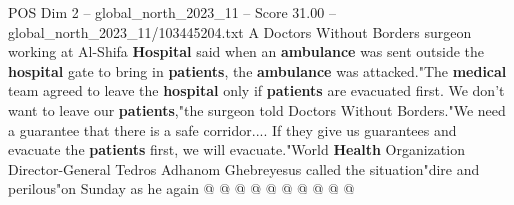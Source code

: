 \begin{textsample}{POS Dim 2 – global\_north\_2023\_11 – Score 31.00 – global\_north\_2023\_11/103445204.txt}
A Doctors Without Borders surgeon working at Al-Shifa \textbf{Hospital} said when an \textbf{ambulance} was sent outside the \textbf{hospital} gate to bring in \textbf{patients}, the \textbf{ambulance} was attacked."The \textbf{medical} team agreed to leave the \textbf{hospital} only if \textbf{patients} are evacuated first.
We don't want to leave our \textbf{patients},"the surgeon told Doctors Without Borders."We need a guarantee that there is a safe corridor....
If they give us guarantees and evacuate the \textbf{patients} first, we will evacuate."World \textbf{Health} Organization Director-General Tedros Adhanom Ghebreyesus called the situation"dire and perilous"on Sunday as he again @ @ @ @ @ @ @ @ @ @

\end{textsample}
